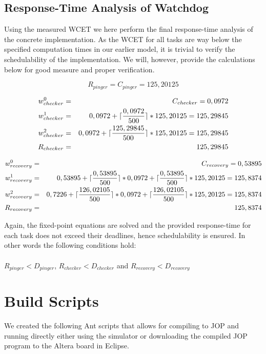 \section{Response-Time Analysis of Watchdog} %
\label{sec:response_time_analysis_of_watchdog}
Using the measured WCET we here perform the final response-time analysis of the concrete implementation. As the WCET for all tasks are way below the specified computation times in our earlier model, it is trivial to verify the schedulability of the implementation. We will, however, provide the calculations below for good measure and proper verification.

\begin{equation}
\label{eq:pingerrta}
     R_{pinger} = C_{pinger} = 125,20125
\end{equation}

\begin{eqnarray}
    w_{checker}^0 &=& C_{checker} = 0,0972 \nonumber \\ 
    w_{checker}^1 &=& 0,0972 + \lceil\frac{0,0972}{500}\rceil*125,20125 = 125,29845 \nonumber \\ 
    w_{checker}^2 &=& 0,0972 + \lceil\frac{125,29845}{500}\rceil*125,20125 = 125,29845 \nonumber \\
    R_{checker} &=& 125,29845
\end{eqnarray}

\begin{eqnarray}
    w_{recovery}^0 &=& C_{recovery} = 0,53895 \nonumber \\ 
    w_{recovery}^1 &=& 0,53895 + \lceil\frac{0,53895}{500}\rceil*0,0972 + \lceil\frac{0,53895}{500}\rceil*125,20125 = 125,8374 \nonumber \\ 
    w_{recovery}^2 &=& 0,7226 + \lceil\frac{126,02105}{500}\rceil*0,0972 + \lceil\frac{126,02105}{500}\rceil*125,20125 = 125,8374 \nonumber \\
    R_{recovery} &=& 125,8374
\end{eqnarray}

Again, the fixed-point equations are solved and the provided response-time for each task does not exceed their deadlines, hence schedulability is ensured. In other words the following conditions hold: \\\\
$R_{pinger} < D_{pinger}$, $R_{checker} < D_{checker}$ and $R_{recovery} < D_{recovery}$



\chapter{Build Scripts} %
\label{cha:build_scripts}
We created the following Ant scripts that allows for compiling to JOP and running directly either using the simulator or downloading the compiled JOP program to the Altera board in Eclipse.



